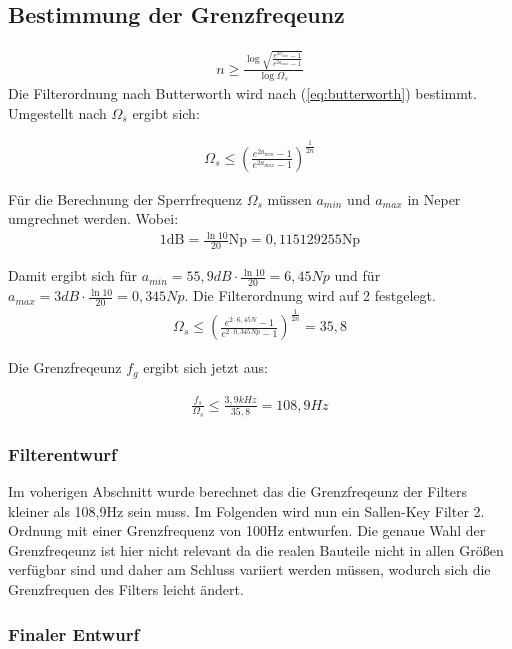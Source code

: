 \subsection{Bestimmung der Grenzfreqeunz}
\begin{align}
n \ge \frac{\log{\sqrt{\frac{e^{2a_{min}}-1}{e^{2a_{max}}-1}}}}{\log{\Omega_s}}
\label{eq:butterworth}
\end{align}
Die Filterordnung nach Butterworth wird nach (\ref{eq:butterworth}) bestimmt. Umgestellt nach $\Omega_s$ ergibt sich:

\begin{align}
\Omega_s \le  \left(\frac{e^{2a_{min}}-1}{e^{2a_{max}}-1}\right)^{\frac{1}{2n}}
\end{align}



Für die Berechnung der Sperrfrequenz $\Omega_s$ müssen  $a_{min}$ und $a_{max}$ in Neper umgrechnet werden. Wobei:
\begin{align*}
1 \text{dB} =  \frac{\ln{10}}{20}\text{Np} = 0,115129255 \text{Np}   
\end{align*}

Damit ergibt sich für $a_{min}=55,9 dB\cdot \frac{\ln{10}}{20}=6,45Np$ und für  $a_{max}=3 dB\cdot \frac{\ln{10}}{20}=0,345Np$. Die Filterordnung wird auf 2 festgelegt.
\begin{align}
\Omega_s \le  \left(\frac{e^{2\cdot6,45N }-1}{e^{2\cdot 0,345Np}-1}\right)^{\frac{1}{2n}}  = 35,8
\end{align}

Die Grenzfreqeunz $f_g$ ergibt sich jetzt aus:

\begin{align}
\frac{f_s}{\Omega_s} \le \frac{3,9kHz}{35,8} = 108,9Hz
\end{align}

\subsubsection{Filterentwurf}
Im voherigen Abschnitt wurde berechnet das die Grenzfreqeunz der Filters kleiner als 108,9Hz sein muss.
Im Folgenden wird nun ein Sallen-Key Filter 2. Ordnung mit einer Grenzfrequenz von 100Hz entwurfen.
Die genaue Wahl der Grenzfreqeunz ist hier nicht relevant da die realen Bauteile nicht in  allen Größen 
verfügbar sind und daher am Schluss variiert werden müssen, wodurch sich die Grenzfrequen des Filters leicht ändert.


\subsubsection{Finaler Entwurf}



